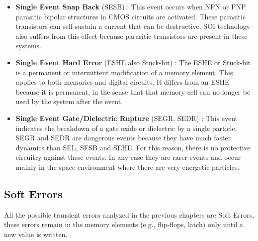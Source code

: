 {{{{{\begin{itemize}
						\item \textbf{Single Event Snap Back} (SESB) : This event occurs when NPN or PNP parasitic bipolar structures in CMOS circuits are activated. These parasitic transistors can self-sustain a current that can be destructive. SOI technology also suffers from this effect because parasitic transistors are present in these systems. 
						
						\item \textbf{Single Event Hard Error} (ESHE also Stuck-bit) : The ESHE or Stuck-bit is a permanent or intermittent modification of a memory element. This applies to both memories and digital circuits. It differs from an ESHE because it is permanent, in the sense that that memory cell can no longer be used by the system after the event.
						
						\item \textbf{Single Event Gate/Dielectric Rupture} (SEGR, SEDR) : This event indicates the breakdown of a gate oxide or dielectric by a single particle. SEGR and SEDR are dangerous events because they have much faster dynamics than SEL, SESB and SEHE. For this reason, there is no protective circuitry against these events.  In any case they are rarer events and occur mainly in the space environment where there are very energetic particles. 
					\end{itemize} 
					
				} %
			}%
		}%
			
		\newpage
		\subsection{Soft Errors}{
			All the possible transient errors analyzed in the previous chapters are Soft Errors, these errors remain in the memory elements (e.g., flip-flops, latch) only until a new value is written.
			
}}}
